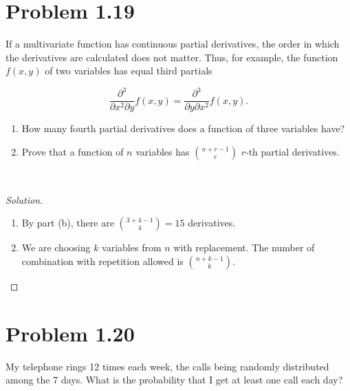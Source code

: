 \documentclass[12pt,letterpaper,reqno]{amsart}
\numberwithin{equation}{subsection}
\begin{document}
\newpage
\section{Problem 1.19}

If a multivariate function has continuous partial derivatives, the order in which the derivatives are calculated does not matter. Thus, for example, the function $f(x,y)$ of two variables has equal third partials

\[ \frac{\partial^3}{\partial x^2 \partial y} f(x,y) = \frac{\partial^3}{\partial y \partial x^2} f(x,y). \]

\begin{enumerate}[label=(\alph*),leftmargin=*]
    \item How many fourth partial derivatives does a function of three variables have?
    \item Prove that a function of $n$ variables has $\binom{n+r-1}{r}$ $r$-th partial derivatives.
\end{enumerate}~\\

\begin{proof}[Solution]~\\

\begin{enumerate}[label=(\alph*),leftmargin=*]
    \item By part (b), there are $\binom{3 + 4 - 1}{4} = 15$ derivatives.
    \item We are choosing $k$ variables from $n$ with replacement. The number of combination with repetition allowed is $\binom{n+k - 1}{k}$.
\end{enumerate}
\end{proof}

\newpage
\section{Problem 1.20}

My telephone rings 12 times each week, the calls being randomly distributed among the 7 days. What is the probability that I get at least one call each day?
\end{document}
